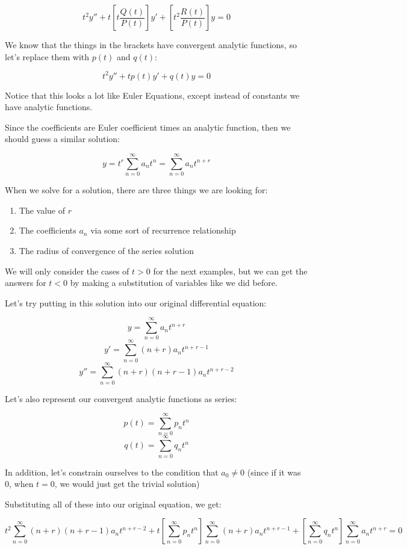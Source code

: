 \documentclass{report}
\begin{document}
{$$t^2y'' + t\left[t\frac{Q(t)}{P(t)}\right]y' + \left[t^2\frac{R(t)}{P(t)}\right]y = 0$$

We know that the things in the brackets have convergent analytic functions, so let's replace them with $p(t)$ and $q(t)$:

$$t^2y'' + tp(t)y' + q(t)y = 0$$

Notice that this looks a lot like Euler Equations, except instead of constants we have analytic functions.

Since the coefficients are Euler coefficient times an analytic function, then we should guess a similar solution:

$$y = t^r\sum_{n=0}^\infty a_{n}t^{n} = \sum_{n=0}^\infty a_{n}t^{n+r}$$

When we solve for a solution, there are three things we are looking for:

\begin{enumerate}
	\item The value of $r$
	\item The coefficients $a_n$ via some sort of recurrence relationship
	\item The radius of convergence of the series solution
\end{enumerate}

We will only consider the cases of $t > 0$ for the next examples, but we can get the answers for $t < 0$ by making a substitution of variables like we did before.

Let's try putting in this solution into our original differential equation:

$$y = \sum_{n=0}^\infty a_{n}t^{n+r}$$
$$y' = \sum_{n=0}^\infty (n+r)a_{n}t^{n+r-1}$$
$$y'' = \sum_{n=0}^\infty (n+r)(n+r-1)a_{n}t^{n+r-2}$$

Let's also represent our convergent analytic functions as series:

$$p(t) = \sum_{n=0}^\infty p_{n}t^{n}$$
$$q(t) = \sum_{n=0}^\infty q_{n}t^{n}$$

In addition, let's constrain ourselves to the condition that $a_0 \neq 0$ (since if it was 0, when $t=0$, we would just get the trivial solution)

Substituting all of these into our original equation, we get:

$$t^2\sum_{n=0}^\infty (n+r)(n+r-1)a_{n}t^{n+r-2} 
+
t\left[\sum_{n=0}^\infty p_{n}t^{n}\right]\sum_{n=0}^\infty (n+r)a_{n}t^{n+r-1}
+
\left[ \sum_{n=0}^\infty q_{n}t^{n} \right]\sum_{n=0}^\infty a_{n}t^{n+r}
= 0
$$

}
\end{document}
